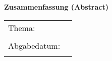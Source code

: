 \begin{center}
{\Large \textbf{Zusammenfassung (Abstract)}}
\end{center}

\bigskip

\begin{center}
	\begin{tabular}{p{2.8cm}p{10cm}}
		Thema: & \thema \\
		 & \\
		Abgabedatum: & \abgabedatum \\
		 & \\
	\end{tabular}
\end{center}

\bigskip

\noindent
\zusammenfassung